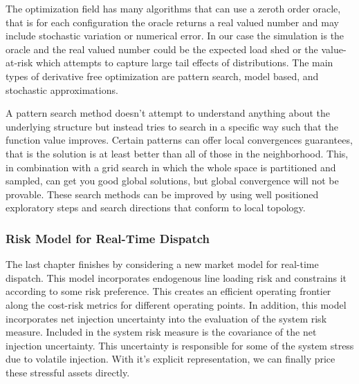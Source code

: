 The optimization field has many algorithms that can use a zeroth order oracle, that is for each configuration the oracle returns a real valued number and may include stochastic variation or numerical error.  In our case the simulation is the oracle and the real valued number could be the expected load shed or the value-at-risk which attempts to capture large tail effects of distributions.  The main types of derivative free optimization are pattern search, model based, and stochastic approximations.  

A pattern search method doesn't attempt to understand anything about the underlying structure but instead tries to search in a specific way such that the function value improves.  Certain patterns can offer local convergences guarantees, that is the solution is at least better than all of those in the neighborhood.  This, in combination with a grid search in which the whole space is partitioned and sampled, can get you good global solutions, but global convergence will not be provable.  These search methods can be improved by using well positioned exploratory steps and search directions that conform to local topology.


\subsubsection{Risk Model for Real-Time Dispatch}
The last chapter finishes by considering a new market model for real-time dispatch.  This model incorporates endogenous line loading risk and constrains it according to some risk preference.  This creates an efficient operating frontier along the cost-risk metrics for different operating points.  In addition, this model incorporates net injection uncertainty into the evaluation of the system risk measure.  Included in the system risk measure is the covariance of the net injection uncertainty.  This uncertainty is responsible for some of the system stress due to volatile injection.  With it's explicit representation, we can finally price these stressful assets directly.\endnote{}

